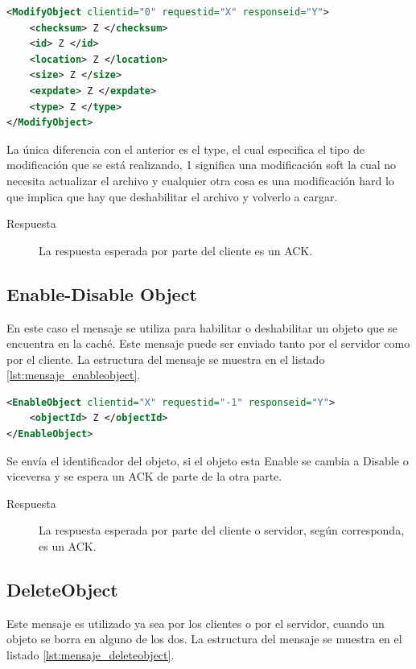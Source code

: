 \begin{lstlisting}[language=XML,caption={Mensaje de ModifyObject},label={lst:mensaje_modifyobject}]
<ModifyObject clientid="0" requestid="X" responseid="Y"> 
	<checksum> Z </checksum>
	<id> Z </id>
	<location> Z </location>
	<size> Z </size>
	<expdate> Z </expdate>
	<type> Z </type>
</ModifyObject>
\end{lstlisting}

La única diferencia con el anterior es el type, el cual especifica el tipo de modificación que se está realizando, 1 significa una modificación soft la cual no necesita actualizar el archivo y cualquier otra cosa es una modificación hard lo que implica que hay que deshabilitar el archivo y volverlo a cargar.

\begin{description}
\item[Respuesta] La respuesta esperada por parte del cliente es un ACK.
\end{description}

\subsection{Enable-Disable Object}

En este caso el mensaje se utiliza para habilitar o deshabilitar un objeto que se encuentra en la caché. Este mensaje puede ser enviado tanto por el servidor como por el cliente. La estructura del mensaje se muestra en el listado \ref{lst:mensaje_enableobject}.

\begin{lstlisting}[language=XML,caption={Mensaje de EnableObject},label={lst:mensaje_enableobject}]
<EnableObject clientid="X" requestid="-1" responseid="Y"> 
	<objectId> Z </objectId>
</EnableObject>
\end{lstlisting}

Se envía el identificador del objeto, si el objeto esta Enable se cambia a Disable o viceversa  y se espera un ACK de parte de la otra parte.

\begin{description}
\item[Respuesta] La respuesta esperada por parte del cliente o servidor, según corresponda, es un ACK.
\end{description}

\subsection{DeleteObject}
Este mensaje es utilizado ya sea por los clientes o por el servidor, cuando un objeto se borra en alguno de los dos. La estructura del mensaje se muestra en el listado \ref{lst:mensaje_deleteobject}.

